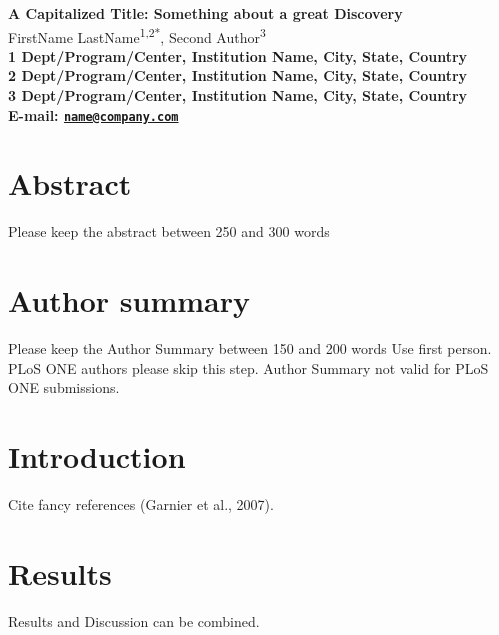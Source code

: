 \documentclass[10pt]{article}
\date{}
\begin{document}
\begin{flushleft}
{\Large
\textbf{A Capitalized Title: Something about a great Discovery}
}
\\
  FirstName LastName\textsuperscript{1,2*},
  Second Author\textsuperscript{3}\\
\bf{1} Dept/Program/Center, Institution Name,  City,  State,  Country
\\
\bf{2} Dept/Program/Center, Institution Name,  City,  State,  Country
\\
\bf{3} Dept/Program/Center, Institution Name,  City,  State,  Country
\\

\textasteriskcentered{} E-mail:   \href{mailto:name@company.com}{\nolinkurl{name@company.com}}
  

\end{flushleft}

\section*{Abstract}\label{abstract}

Please keep the abstract between 250 and 300 words

\section*{Author summary}\label{author-summary}

Please keep the Author Summary between 150 and 200 words Use first
person. PLoS ONE authors please skip this step. Author Summary not valid
for PLoS ONE submissions.

\section*{Introduction}\label{introduction}

Cite fancy references (Garnier et al., 2007).

\section*{Results}\label{results}

Results and Discussion can be combined.
\end{document}
